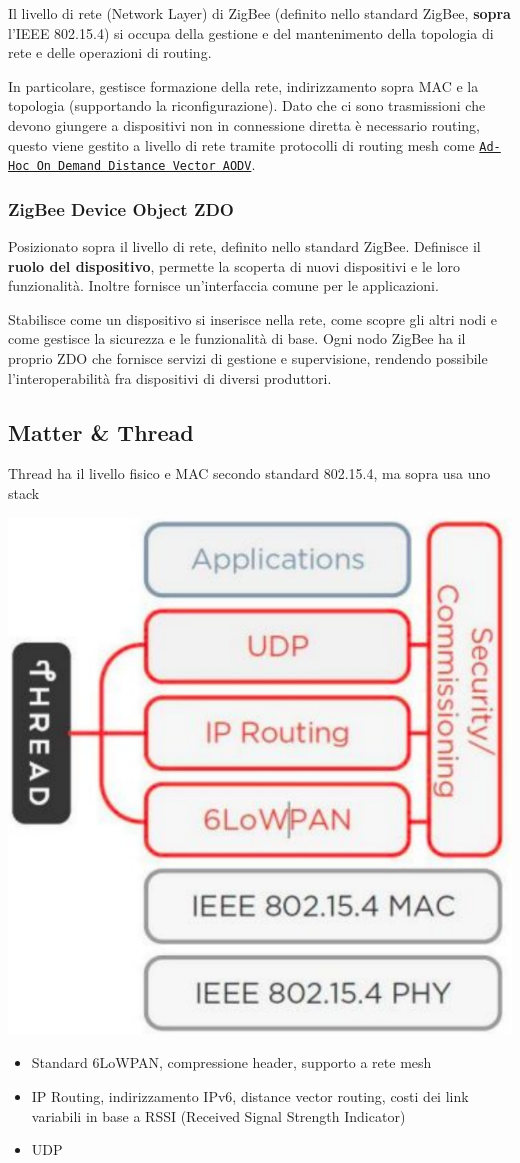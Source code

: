 Il livello di rete (Network Layer) di ZigBee (definito nello standard ZigBee, \textbf{sopra} l'IEEE 802.15.4) si occupa della gestione e del mantenimento della topologia di rete e delle operazioni di routing. 

In particolare, gestisce formazione della rete, indirizzamento sopra MAC e la topologia (supportando la riconfigurazione). Dato che ci sono trasmissioni che devono giungere a dispositivi non in connessione diretta è necessario routing, questo viene gestito a livello di rete tramite protocolli di routing mesh come \href{https://en.wikipedia.org/wiki/Ad_hoc_On-Demand_Distance_Vector_Routing}{\texttt{Ad-Hoc On Demand Distance Vector AODV}}.

\subsubsection{ZigBee Device Object ZDO}

Posizionato sopra il livello di rete, definito nello standard ZigBee. Definisce il \textbf{ruolo del dispositivo}, permette la scoperta di nuovi dispositivi e le loro funzionalità. Inoltre fornisce un'interfaccia comune per le applicazioni.

Stabilisce come un dispositivo si inserisce nella rete, come scopre gli altri nodi e come gestisce la sicurezza e le funzionalità di base. Ogni nodo ZigBee ha il proprio ZDO che fornisce servizi di gestione e supervisione, rendendo possibile l'interoperabilità fra dispositivi di diversi produttori. 

\subsection{Matter \& Thread}
Thread ha il livello fisico e MAC secondo standard 802.15.4, ma sopra usa uno stack
\begin{center}
	\includegraphics[width=0.5\linewidth]{img/wpan/thread}
\end{center}
\begin{itemize}
	\item Standard 6LoWPAN, compressione header, supporto a rete mesh

	\item IP Routing, indirizzamento IPv6, distance vector routing, costi dei link variabili in base a RSSI (Received Signal Strength Indicator)

	\item UDP
\end{itemize}

